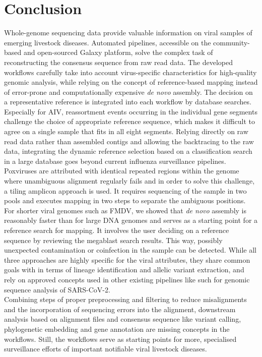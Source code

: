 \chapter{Conclusion}\label{chap:conclusion}
Whole-genome sequencing data provide valuable information on viral samples of emerging livestock diseases. Automated pipelines, accessible on the community-based and open-sourced Galaxy platform, solve the complex task of reconstructing the consensus sequence from raw read data. The developed workflows carefully take into account virus-specific characteristics for high-quality genomic analysis, while relying on the concept of reference-based mapping instead of error-prone and computationally expensive \textit{de novo} assembly. The decision on a representative reference is integrated into each workflow by database searches. Especially for \ac{AIV}, reassortment events occurring in the individual gene segments challenge the choice of appropriate reference sequence, which makes it difficult to agree on a single sample that fits in all eight segments. Relying directly on raw read data rather than assembled contigs and allowing the backtracing to the raw data, integrating the dynamic reference selection based on a classification search in a large database goes beyond current influenza surveillance pipelines.\\
Poxviruses are attributed with identical repeated regions within the genome where unambiguous alignment regularly fails and in order to solve this challenge, a tiling amplicon approach is used. It requires sequencing of the sample in two pools and executes mapping in two steps to separate the ambiguous positions.\\
For shorter viral genomes such as \ac{FMDV}, we showed that \textit{de novo} assembly is reasonably faster than for large \ac{DNA} genomes and serves as a starting point for a reference search for mapping. It involves the user deciding on a reference sequence by reviewing the megablast search results. This way, possibly unexpected contamination or coinfection in the sample can be detected. While all three approaches are highly specific for the viral attributes, they share common goals with in terms of lineage identification and allelic variant extraction, and rely on approved concepts used in other existing pipelines like such for genomic sequence analysis of \ac{SARS-CoV-2}.\\
Combining steps of proper preprocessing and filtering to reduce misalignments and the incorporation of sequencing errors into the alignment, downstream analysis based on alignment files and consensus sequence like variant calling, phylogenetic embedding and gene annotation are missing concepts in the workflows. Still, the workflows serve as starting points for more, specialised surveillance efforts of important notifiable viral livestock diseases.
